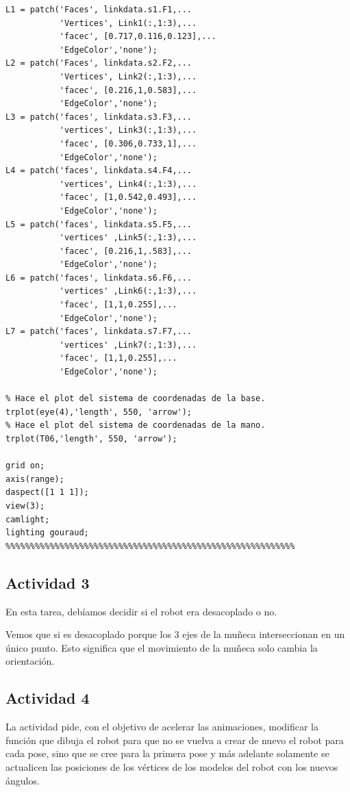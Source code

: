 \documentclass{article}
\begin{document}
\begin{lstlisting}[frame=single]
L1 = patch('Faces', linkdata.s1.F1,...
           'Vertices', Link1(:,1:3),...
           'facec', [0.717,0.116,0.123],...
           'EdgeColor','none');
L2 = patch('Faces', linkdata.s2.F2,...
           'Vertices', Link2(:,1:3),...
           'facec', [0.216,1,0.583],...
           'EdgeColor','none');
L3 = patch('faces', linkdata.s3.F3,...
           'vertices', Link3(:,1:3),...
           'facec', [0.306,0.733,1],...
           'EdgeColor','none');
L4 = patch('faces', linkdata.s4.F4,...
           'vertices', Link4(:,1:3),...
           'facec', [1,0.542,0.493],...
           'EdgeColor','none');
L5 = patch('faces', linkdata.s5.F5,...
           'vertices' ,Link5(:,1:3),...
           'facec', [0.216,1,.583],...
           'EdgeColor','none');
L6 = patch('faces', linkdata.s6.F6,...
           'vertices' ,Link6(:,1:3),...
           'facec', [1,1,0.255],...
           'EdgeColor','none');
L7 = patch('faces', linkdata.s7.F7,...
           'vertices' ,Link7(:,1:3),...
           'facec', [1,1,0.255],...
           'EdgeColor','none');
       
% Hace el plot del sistema de coordenadas de la base.
trplot(eye(4),'length', 550, 'arrow');
% Hace el plot del sistema de coordenadas de la mano.
trplot(T06,'length', 550, 'arrow');

grid on;
axis(range);
daspect([1 1 1]);
view(3); 
camlight;
lighting gouraud;
%%%%%%%%%%%%%%%%%%%%%%%%%%%%%%%%%%%%%%%%%%%%%%%%%%%%%%%%%%%
\end{lstlisting}

\subsection{Actividad 3}
En esta tarea, debíamos decidir si el robot era desacoplado o no.

Vemos que si es desacoplado porque los 3 ejes de la muñeca interseccionan en un 
único punto. Esto significa que el movimiento de la muñeca solo cambia la orientación. 

\subsection{Actividad 4}
La actividad pide, con el objetivo de acelerar las animaciones, modificar la función que dibuja el robot para que no se vuelva a crear de nuevo el robot para cada pose, 
sino que se cree para la primera pose y más adelante solamente se actualicen las posiciones de los vértices de los modelos del robot con los nuevos ángulos.
\end{document}
